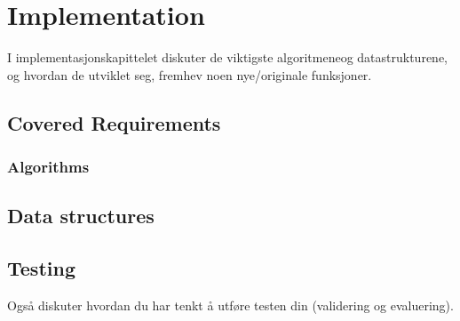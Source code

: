 
\chapter{Implementation}

\minitoc

I implementasjonskapittelet diskuter de viktigste
algoritmeneog datastrukturene,
og hvordan de utviklet seg,
fremhev noen nye/originale funksjoner.

\clearpage

\section{Covered Requirements}
\subsection{Algorithms}

\section{Data structures}

\section{Testing}
Også diskuter hvordan du har tenkt å utføre testen din (validering og evaluering).
